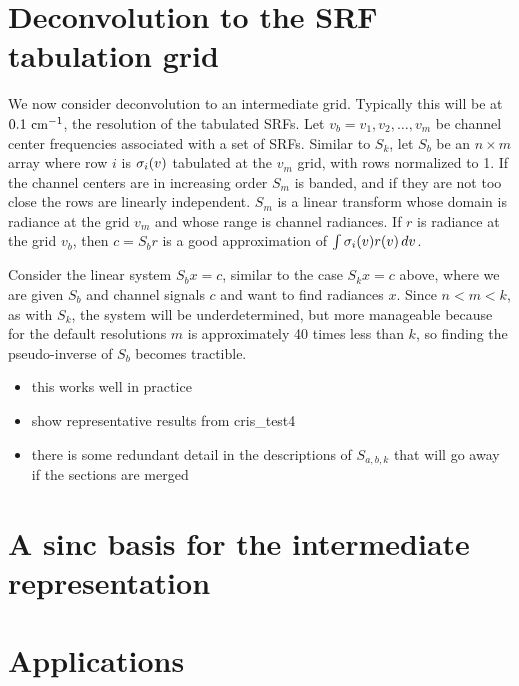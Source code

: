 \documentclass[11pt]{article}
\begin{document}
\section{Deconvolution to the SRF tabulation grid}

We now consider deconvolution to an intermediate grid.  Typically
this will be at $0.1\ \mbox{\small cm}^{-1}$, the resolution of the tabulated SRFs.
Let $v_b = v_1,v_2,\ldots,v_m$ be channel center frequencies
associated with a set of SRFs.  Similar to $S_k$, let $S_b$ be an
$n\times m$ array where row $i$ is $\sigma_i(v)$ tabulated at the
$v_m$ grid, with rows normalized to 1.  If the channel centers are
in increasing order $S_m$ is banded, and if they are not too close
the rows are linearly independent.  $S_m$ is a linear transform
whose domain is radiance at the grid $v_m$ and whose range is
channel radiances.  If $r$ is radiance at the grid $v_b$, then $c =
S_b r$ is a good approximation of $\int\sigma_i(v)r(v)\,dv$.

Consider the linear system $S_b x = c$, similar to the case $S_k x =
c$ above, where we are given $S_b$ and channel signals $c$ and want
to find radiances $x$.  Since $n < m < k$, as with $S_k$, the system
will be underdetermined, but more manageable because for the default
resolutions $m$ is approximately 40 times less than $k$, so finding
the pseudo-inverse of $S_b$ becomes tractible.

\begin{itemize}
  \item this works well in practice
  \item show representative results from cris\_test4
  \item there is some redundant detail in the descriptions of
    $S_{a,b,k}$ that will go away if the sections are merged
\end{itemize}

\section{A sinc basis for the intermediate representation}

\section{Applications}
\end{document}
